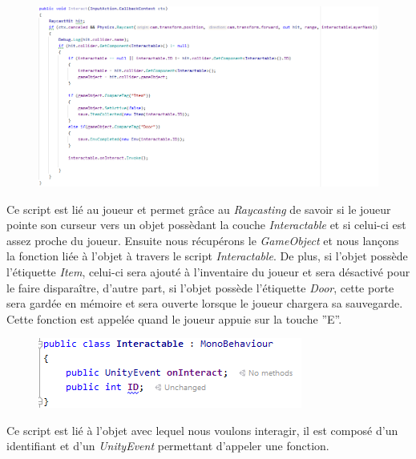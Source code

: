 \newline
\begin{description}
    \begin{figure}[H]
\centering
\begin{minipage}{.5\textwidth}
  \centering
  \centerline{\includegraphics[width=2.25\linewidth]{img/gameplay/interactor.PNG}}
  \label{fig:octobercrowfont}
\end{minipage}%
\end{figure}
    \item[\emph{Interactor} -] Ce script est lié au joueur et permet grâce au \emph{Raycasting} de savoir si le joueur pointe son curseur vers un objet possèdant la couche \emph{Interactable} et si celui-ci est assez proche du joueur. Ensuite nous récupérons le \emph{GameObject} et nous lançons la fonction liée à l’objet à travers le script \emph{Interactable}. De plus, si l’objet possède l'étiquette \emph{Item}, celui-ci sera ajouté à l’inventaire du joueur et sera désactivé pour le faire disparaître, d’autre part, si l’objet possède l'étiquette \emph{Door}, cette porte sera gardée en mémoire et sera ouverte lorsque le joueur chargera sa sauvegarde. Cette fonction est appelée quand le joueur appuie sur la touche ''E''.
\begin{figure}[H]
\centering
\begin{minipage}{.5\textwidth}
  \centering
  \centerline{\includegraphics[width=1.5\linewidth]{img/gameplay/interactable.PNG}}
  \label{fig:octobercrowfont}
\end{minipage}%
\end{figure}
    \item[\emph{Interactable} -] Ce script est lié à l’objet avec lequel nous voulons interagir, il est composé d’un identifiant et d’un \emph{UnityEvent} permettant d’appeler une fonction.
\end{description}

